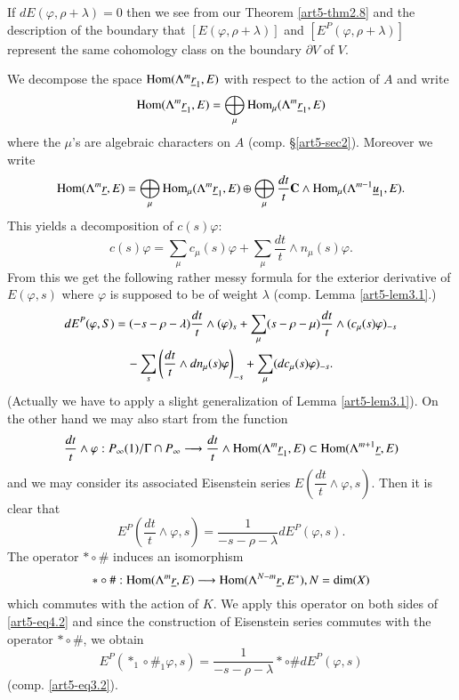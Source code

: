 If $d E (\varphi, \rho + \lambda) = 0$ then we see from our Theorem \ref{art5-thm2.8} and the description of the boundary that $[E(\varphi, \rho + \lambda)]$ and $[E^P (\varphi, \rho +\lambda)]$ represent the same cohomology class on the boundary $\partial V$ of $V$.

We decompose the space $\operatorname{Hom} (\Lambda^m \underline{r}_1, E)$ with respect to the action of $A$ and write
$$
\operatorname{Hom} (\Lambda^m \underline{r}_1, E) = \bigoplus_\mu \operatorname{Hom}_\mu (\Lambda^m \underline{r}_1, E)
$$\pageoriginale
where the $\mu$'s are algebraic characters on $A$ (comp. \S \ref{art5-sec2}). Moreover we write
$$
\operatorname{Hom} (\Lambda^m \underline{r}, E) =\bigoplus_\mu \operatorname{Hom}_\mu (\Lambda^m \underline{r}_1, E) \oplus \bigoplus_\mu \dfrac{dt}{t} \mathbf{C} \wedge \operatorname{Hom}_\mu (\Lambda^{m-1} \underline{u}_{1}, E).
$$
This yields a decomposition of $c (s) \varphi$:
$$
c (s) \varphi = \sum\limits_\mu c_\mu (s) \varphi + \sum\limits_\mu \frac{dt}{t} \wedge n_\mu (s) \varphi.
$$
From this we get the following rather messy formula for the exterior derivative of $E (\varphi, s)$ where $\varphi$ is supposed to be of weight $\lambda$ (comp. Lemma \ref{art5-lem3.1}.)
\setcounter{equation}{0}
\begin{align}
dE^P (\varphi, S) & = (-s - \rho - \lambda) \frac{dt}{t} \wedge (\varphi)_s + \sum\limits_\mu (s - \rho - \mu) \frac{dt}{t} \wedge (c_\mu (s) \varphi)_{-s} \notag\\
& \quad - \sum\limits_s \left(\frac{dt}{t} \wedge dn_\mu (s) \varphi  \right)_{-s} + \sum\limits_\mu (dc_\mu (s) \varphi)_{-s}.   \label{art5-eq4.1}
\end{align}
(Actually we have to apply a slight generalization of Lemma \ref{art5-lem3.1}). On the other hand we may also start from the function
$$
\frac{dt}{t} \wedge \varphi : P_\infty (1) / \Gamma \cap P_\infty \longrightarrow \dfrac{dt}{t} \wedge \operatorname{Hom} (\Lambda^m \underline{r}_1, E) \subset \operatorname{Hom} (\Lambda^{m+1} \underline{r}, E)
$$
and we may consider its associated Eisenstein series $E \left(\dfrac{dt}{t} \wedge \varphi, s \right)$. Then it is clear that 
\begin{equation}
E^P \left(\frac{dt}{t}  \wedge \varphi, s \right) =\frac{1}{-s-\rho - \lambda} dE^P(\varphi, s). \label{art5-eq4.2}
\end{equation}
The operator $\ast \circ \#$ induces an isomorphism
$$
\ast \circ \# : \operatorname{Hom} (\Lambda^m \underline{r}, E) \longrightarrow \operatorname{Hom} (\Lambda^{N-m} \underline{r}, E^\ast), N = \dim (X)
$$
which commutes with the action of $K$. We apply this operator on both sides of \eqref{art5-eq4.2} and since the construction of Eisenstein series commutes with the operator $\ast \circ \#$, we obtain
\begin{equation}
E^P(\ast_1 \circ \#_1 \varphi, s) = \frac{1}{-s-\rho-\lambda} \ast \circ \# d E^P (\varphi, s)
\label{art5-eq4.3}
\end{equation}
(comp. \eqref{art5-eq3.2}).


